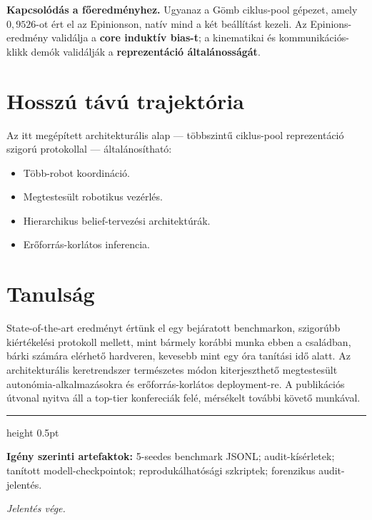 \documentclass[11pt,a4paper]{article}
\begin{document}
\textbf{Kapcsol\'od\'as a f\H{o}eredm\'enyhez.} Ugyanaz a G\"omb
ciklus-pool g\'epezet, amely $0{,}9526$-ot \'ert el az Epinionson,
nat\'iv mind a k\'et beáll\'it\'ast kezeli. Az Epinions-eredm\'eny
valid\'alja a \textbf{core indukt\'iv bias-t}; a kinematikai \'es
kommunik\'aci\'os-klikk dem\'ok valid\'alj\'ak a \textbf{reprezent\'aci\'o
\'altal\'anoss\'ag\'at}.

\section{Hossz\'u t\'av\'u trajekt\'oria}

Az itt meg\'ep\'itett architektur\'alis alap — t\"obbszint\H{u}
ciklus-pool reprezent\'aci\'o szigor\'u protokollal — \'altal\'anos\'ithat\'o:

\begin{itemize}
  \item T\"obb-robot koordin\'aci\'o.
  \item Megtestes\"ult robotikus vez\'erl\'es.
  \item Hierarchikus belief-tervez\'esi architekt\'ur\'ak.
  \item Er\H{o}forr\'as-korl\'atos inferencia.
\end{itemize}

\section{Tanuls\'ag}

State-of-the-art eredm\'enyt \'ert\"unk el egy bej\'aratott
benchmarkon, szigor\'ubb ki\'ert\'ekel\'esi protokoll mellett, mint
b\'armely kor\'abbi munka ebben a csal\'adban, b\'arki sz\'am\'ara
el\'erhet\H{o} hardveren, kevesebb mint egy \'ora tan\'it\'asi id\H{o}
alatt. Az architektur\'alis keretrendszer term\'eszetes m\'odon
kiterjeszthet\H{o} megtestes\"ult auton\'omia-alkalmaz\'asokra \'es
er\H{o}forr\'as-korl\'atos deployment-re. A publik\'aci\'os \'utvonal
nyitva \'all a top-tier konfereci\'ak fel\'e, m\'ers\'ekelt tov\'abbi
k\"ovet\H{o} munk\'aval.

\vspace{1em}
\hrule height 0.5pt
\vspace{0.5em}

\noindent\textbf{Ig\'eny szerinti artefaktok:} 5-seedes benchmark
JSONL; audit-k\'is\'erletek; tan\'itott modell-checkpointok;
reproduk\'alhat\'os\'agi szkriptek; forenzikus audit-jelent\'es.

\vspace{0.5em}
\textit{Jelent\'es v\'ege.}
\end{document}

